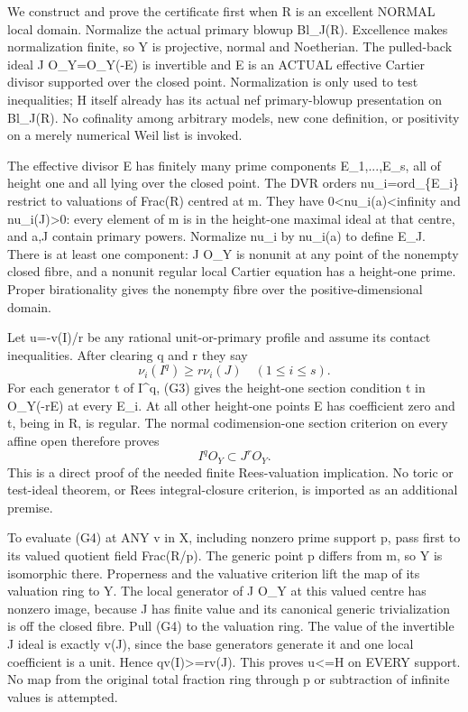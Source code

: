 \documentclass[11pt]{article}
\begin{document}
We construct and prove the certificate first when R is an excellent NORMAL local domain. Normalize the actual primary blowup Bl\_J(R). Excellence makes normalization finite, so Y is projective, normal and Noetherian. The pulled-back ideal J O\_Y=O\_Y(-E) is invertible and E is an ACTUAL effective Cartier divisor supported over the closed point. Normalization is only used to test inequalities; H itself already has its actual nef primary-blowup presentation on Bl\_J(R). No cofinality among arbitrary models, new cone definition, or positivity on a merely numerical Weil list is invoked.

The effective divisor E has finitely many prime components E\_1,...,E\_s, all of height one and all lying over the closed point. The DVR orders nu\_i=ord\_\{E\_i\} restrict to valuations of Frac(R) centred at m. They have 0<nu\_i(a)<infinity and nu\_i(J)>0: every element of m is in the height-one maximal ideal at that centre, and a,J contain primary powers. Normalize nu\_i by nu\_i(a) to define E\_J. There is at least one component: J O\_Y is nonunit at any point of the nonempty closed fibre, and a nonunit regular local Cartier equation has a height-one prime. Proper birationality gives the nonempty fibre over the positive-dimensional domain.

Let u=-v(I)/r be any rational unit-or-primary profile and assume its contact inequalities. After clearing q and r they say
\[
 \nu_i(I^q)\ge r\nu_i(J)\quad (1\le i\le s).              \tag{G3}
\]
For each generator t of I\textasciicircum{}q, (G3) gives the height-one section condition t in O\_Y(-rE) at every E\_i. At all other height-one points E has coefficient zero and t, being in R, is regular. The normal codimension-one section criterion on every affine open therefore proves
\[
 I^q O_Y\subset J^r O_Y.                                  \tag{G4}
\]
This is a direct proof of the needed finite Rees-valuation implication. No toric or test-ideal theorem, or Rees integral-closure criterion, is imported as an additional premise.

To evaluate (G4) at ANY v in X, including nonzero prime support p, pass first to its valued quotient field Frac(R/p). The generic point p differs from m, so Y is isomorphic there. Properness and the valuative criterion lift the map of its valuation ring to Y. The local generator of J O\_Y at this valued centre has nonzero image, because J has finite value and its canonical generic trivialization is off the closed fibre. Pull (G4) to the valuation ring. The value of the invertible J ideal is exactly v(J), since the base generators generate it and one local coefficient is a unit. Hence qv(I)>=rv(J). This proves u<=H on EVERY support. No map from the original total fraction ring through p or subtraction of infinite values is attempted.
\end{document}
